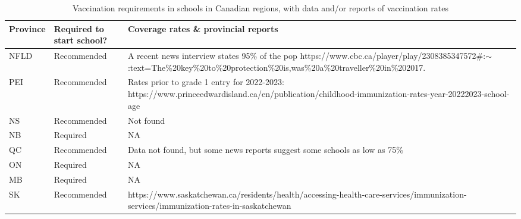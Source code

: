 \documentclass[12pt,a4paper]{article}
\begin{document}
\begin{table}
  \centering

  \caption[Vaccination requirements by province]{Vaccination requirements in schools in Canadian regions, with data and/or reports of vaccination rates}
  \label{tab:vaxrequire}
  \begin{tabular}{lp{3cm}p{10cm}}
	  \bf{Province} & \bf{Required to start school?} & \bf{Coverage rates \& provincial reports}                                                                                                                                                \\ \hline
NFLD     & Recommended               & A recent news interview states 95\% of the pop https://www.cbc.ca/player/play/2308385347572\#:$\sim$:text=The\%20key\%20to\%20protection\%20is,was\%20a\%20traveller\%20in\%202017. \\ \hline
PEI      & Recommended               & Rates prior to grade 1 entry for 2022-2023: https://www.princeedwardisland.ca/en/publication/childhood-immunization-rates-year-20222023-school-age                                  \\ \hline
NS       & Recommended               & Not found                                                                                                                                                                      \\ \hline
NB       & Required                  & NA                                                                                                                                                                                  \\ \hline
QC       & Recommended               & Data not found, but some news reports suggest some schools as low as 75\%                                                                                                                \\ \hline
ON       & Required                  & NA                                                                                                                                                                                  \\ \hline
MB       & Required                  & NA                                                                                                                                                                                  \\ \hline
SK       & Recommended               & https://www.saskatchewan.ca/residents/health/accessing-health-care-services/immunization-services/immunization-rates-in-saskatchewan                                                \\ \hline

\end{tabular}
\end{table}
\end{document}
